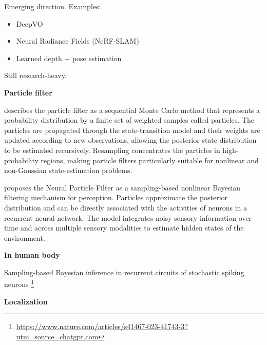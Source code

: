 \documentclass{book}
\providecommand{\ProjectDeepHeading}[2]{%
    \par\medskip\noindent\textbf{#2}\par\smallskip
}
\providecommand{\seeherefooter}[1]{\footnote{\url{#1}}}
\begin{document}

Emerging direction.
    Examples:
    \begin{itemize}
    
        \item DeepVO
        \item Neural Radiance Fields (NeRF-SLAM)
        \item Learned depth + pose estimation
    \end{itemize}
    
    Still research-heavy.

\ProjectDeepHeading{8}{Particle filter}


\cite{arulampalam-2002-a-tutorial-on-particle-filters-for-online-nonlinear-non-gaussian-bayesian-tracking} describes the particle filter as a sequential Monte Carlo method that represents a probability distribution by a finite set of weighted samples called particles. The particles are propagated through the state-transition model and their weights are updated according to new observations, allowing the posterior state distribution to be estimated recursively. Resampling concentrates the particles in high-probability regions, making particle filters particularly suitable for nonlinear and non-Gaussian state-estimation problems.
    
    \cite{kutschireiter-2017-nonlinear-bayesian-filtering-and-learning-a-neuronal-dynamics-for-perception} proposes the Neural Particle Filter as a sampling-based nonlinear Bayesian filtering mechanism for perception. Particles approximate the posterior distribution and can be directly associated with the activities of neurons in a recurrent neural network. The model integrates noisy sensory information over time and across multiple sensory modalities to estimate hidden states of the environment.
    
    \ProjectDeepHeading{11}{In human body}
        Sampling-based Bayesian inference in recurrent circuits of stochastic spiking neurons \seeherefooter{https://www.nature.com/articles/s41467-023-41743-3?utm_source=chatgpt.com}

\ProjectDeepHeading{7}{Localization}
\end{document}
